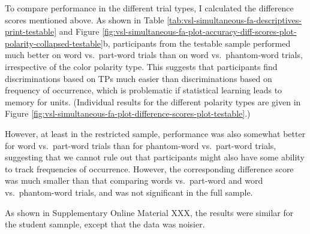 \documentclass[
]{article}
\begin{document}
To compare performance in the different trial types, I calculated the
difference scores mentioned above. As shown in Table
\ref{tab:vsl-simultaneous-fa-descriptives-print-testable} and Figure
\ref{fig:vsl-simultaneous-fa-plot-accuracy-diff-scores-plot-polarity-collapsed-testable}b,
participants from the testable sample performed much better on word
vs.~part-word trials than on word vs.~phantom-word trials, irrespective
of the color polarity type. This suggests that participants find
discriminations based on TPs much easier than discriminations based on
frequency of occurrence, which is problematic if statistical learning
leads to memory for units. (Individual results for the different
polarity types are given in Figure
\ref{fig:vsl-simultaneous-fa-plot-difference-scores-plot-testable}.)

However, at least in the restricted sample, performance was also
somewhat better for word vs.~part-word trials than for phantom-word
vs.~part-word trials, suggesting that we cannot rule out that
participants might also have some ability to track frequencies of
occurrence. However, the corresponding difference score was much smaller
than that comparing words vs.~part-word and word vs.~phantom-word
trials, and was not significant in the full sample.

As shown in Supplementary Online Material XXX, the results were similar
for the student samnple, except that the data was noisier.
\end{document}
